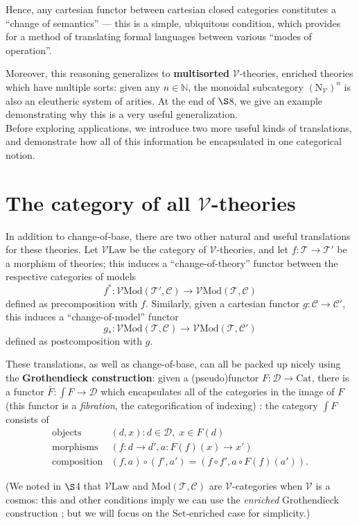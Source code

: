 \documentclass{amsart}
\theoremstyle{definition}
\newcommand{\Set}{\mathrm{Set}}
\newcommand{\Cat}{\mathrm{Cat}}
\newcommand{\Law}{\mathrm{Law}}
\newcommand{\Mod}{\mathrm{Mod}}
\newcommand{\NN}{\mathrm{N}}
\newcommand{\V}{\mathscr{V}}
\newcommand{\D}{\mathscr{D}}
\newcommand{\C}{\mathscr{C}}
\newcommand{\T}{\mathscr{T}}
\newcommand{\maps}{\colon}
\begin{document}
Hence, any cartesian functor between cartesian closed categories constitutes a ``change of semantics'' --- this is a simple, ubiquitous condition, which provides for a method of translating formal languages between various ``modes of operation''.

Moreover, this reasoning generalizes to \textbf{multisorted} $\V$-theories, enriched theories which have multiple sorts: given any $n\in \mathbb{N}$, the monoidal subcategory $(\NN_\V)^n$ is also an eleutheric system of arities. At the end of $\S$8, we give an example demonstrating why this is a very useful generalization.\\

Before exploring applications, we introduce two more useful kinds of translations, and demonstrate how all of this information be encapsulated in one categorical notion.

\section{The category of all $\V$-theories}

In addition to change-of-base, there are two other natural and useful translations for these theories. Let $\V\mathrm{Law}$ be the category of $\V$-theories, and let $f\maps\T\to \T'$ be a morphism of theories; this induces a ``change-of-theory'' functor between the respective categories of models $$f^*\maps\V\Mod(\T',\C)\to \V\Mod(\T,\C)$$ defined as precomposition with $f$. Similarly, given a cartesian functor $g\maps \C \to \C'$, this induces a ``change-of-model'' functor $$g_*\maps\V\Mod(\T,\C) \to \V\Mod(\T,\C')$$ defined as postcomposition with $g$.

These translations, as well as change-of-base, can all be packed up nicely using the \textbf{Grothendieck construction}: given a (pseudo)functor $F\maps \D \to \Cat$, there is a functor $\bar{F}\maps \int F \to \D$ which encapsulates all of the categories in the image of $F$ (this functor is a \textit{fibration}, the categorification of indexing) \cite{groth}: the category $\int F$ consists of
\[\begin{array}{rl}
\text{objects} & (d,x) : d\in \D, \; x\in F(d)\\
\text{morphisms} & (f\maps d\to d',a\maps F(f)(x)\to x')\\
\text{composition} & (f,a) \circ (f',a') = (f \circ f', a \circ F(f)(a')).
\end{array}\]

(We noted in $\S$4 that $\V\Law$ and $\Mod(\T,\C)$ are $\V$-categories when $\V$ is a cosmos: this and other conditions imply we can use the \textit{enriched} Grothendieck construction \cite{engroth}; but we will focus on the $\Set$-enriched case for simplicity.)
\end{document}
